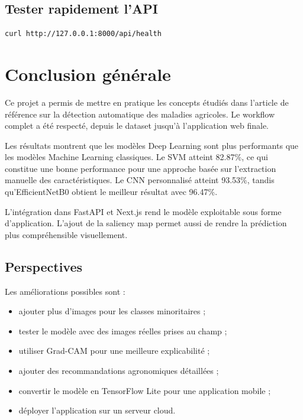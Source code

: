 \documentclass[12pt,a4paper]{report}
\begin{document}
\section{Tester rapidement l'API}
\begin{lstlisting}[caption={Test rapide de l'API}]
curl http://127.0.0.1:8000/api/health
\end{lstlisting}

\chapter{Conclusion générale}

Ce projet a permis de mettre en pratique les concepts étudiés dans l'article de référence sur la détection automatique des maladies agricoles. Le workflow complet a été respecté, depuis le dataset jusqu'à l'application web finale.

Les résultats montrent que les modèles Deep Learning sont plus performants que les modèles Machine Learning classiques. Le SVM atteint 82.87\%, ce qui constitue une bonne performance pour une approche basée sur l'extraction manuelle des caractéristiques. Le CNN personnalisé atteint 93.53\%, tandis qu'EfficientNetB0 obtient le meilleur résultat avec 96.47\%.

L'intégration dans FastAPI et Next.js rend le modèle exploitable sous forme d'application. L'ajout de la saliency map permet aussi de rendre la prédiction plus compréhensible visuellement.

\section*{Perspectives}

Les améliorations possibles sont :
\begin{itemize}
  \item ajouter plus d'images pour les classes minoritaires ;
  \item tester le modèle avec des images réelles prises au champ ;
  \item utiliser Grad-CAM pour une meilleure explicabilité ;
  \item ajouter des recommandations agronomiques détaillées ;
  \item convertir le modèle en TensorFlow Lite pour une application mobile ;
  \item déployer l'application sur un serveur cloud.
\end{itemize}
\end{document}
